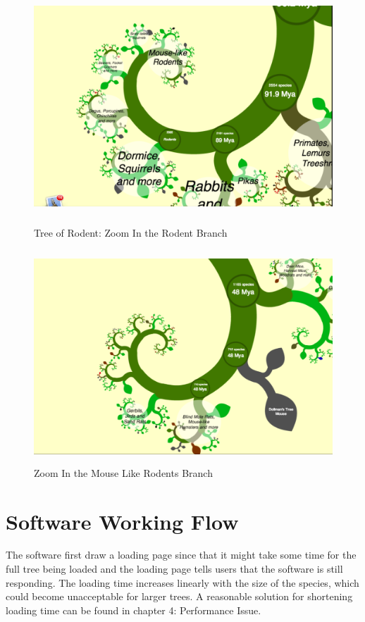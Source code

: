 \documentclass[MSc]{icldt}
\begin{document}
\begin{figure}[H]
  \centering
  \includegraphics [width=15cm,height=8.8cm]{Rodent}
  \caption{Tree of Rodent: Zoom In the Rodent Branch}
  \label{fig:rodent}
\end{figure}

\begin{figure}[H]
  \centering
  \includegraphics [width=15cm,height=8cm]{MouseLikeRodent}
  \caption{Zoom In the Mouse Like Rodents Branch}
  \label{fig:mouseLikeRodent}
\end{figure}

\section{Software Working Flow}

The software first draw a loading page since that it might take some time for the full tree being loaded and the loading page tells users that the software is still responding. The loading time increases linearly with the size of the species, which could become unacceptable for larger trees. A reasonable solution for shortening loading time can be found in chapter 4: Performance Issue. 
\end{document}
